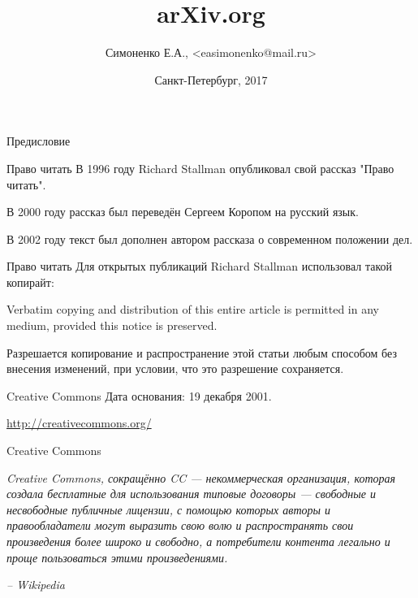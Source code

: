 \documentclass[14pt]{beamer}
\title[arXiv.org]{arXiv.org}
\author[]{Симоненко Е.А., <easimonenko@mail.ru>}
\institute[]{Университет ИТМО}
\date[]{Санкт-Петербург, 2017}
\begin{document}
\itmologoslide

\begin{darkbars}
    \begin{frame}
        \titlepage
    \end{frame}
\end{darkbars}

\begin{frame}
    \itmoanothertitle
\end{frame}

\begin{darkbars}
\begin{frame}[englogoheader]{Предисловие}
\end{frame}
\end{darkbars}

\begin{frame}{Право читать}
В 1996 году Richard Stallman опубликовал свой рассказ "Право читать".

В 2000 году рассказ был переведён Сергеем Коропом на русский язык.

В 2002 году текст был дополнен автором рассказа о современном положении дел.
\end{frame}

\begin{frame}{Право читать}
Для открытых публикаций Richard Stallman использовал такой копирайт:

Verbatim copying and distribution of this entire article is permitted in any medium, provided this notice is preserved.

Разрешается копирование и распространение этой статьи любым способом без внесения изменений, при условии, что это разрешение сохраняется.

\end{frame}

\begin{frame}{Creative Commons}
Дата основания: 19 декабря 2001.

\url{http://creativecommons.org/}
\end{frame}

\begin{frame}{Creative Commons}
\begin{displayquote}
	\textit{
		Creative Commons, сокращённо CC — некоммерческая организация, которая создала бесплатные для использования типовые договоры — свободные и несвободные публичные лицензии, с помощью которых авторы и правообладатели могут выразить свою волю и распространять свои произведения более широко и свободно, а потребители контента легально и проще пользоваться этими произведениями.
	}

	\textit{-- Wikipedia}
\end{displayquote}
\end{frame}
\end{document}
